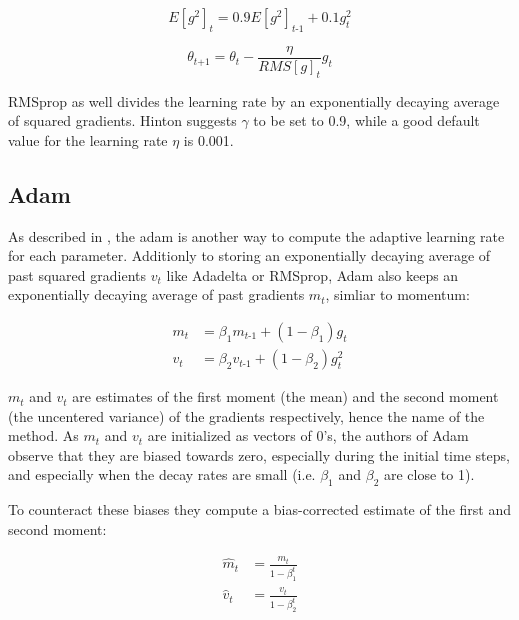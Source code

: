 \documentclass[12pt,oneside,a4paper,parskip]{scrbook}
\begin{document}
\begin{equation}
  \textit{E}[\textit{g}^2]_t = 0.9\textit{E}[\textit{g}^2]_\textit{t-1} + 0.1\textit{g}^2_t
  \label{equ:rmsprop_1}
\end{equation}

\begin{equation}
  \theta_\textit{t+1} = \theta_\textit{t}-\frac{\eta}{RMS[\textit{g}]_t} \textit{g}_\textit{t}
  \label{equ:rmsprop_2}
\end{equation}

RMSprop as well divides the learning rate by an exponentially decaying average of squared gradients.
Hinton suggests $\gamma$ to be set to 0.9, while a good default value for the learning rate $\eta$ is 0.001. \cite{overvieDiffRSLVQ}

\subsection{Adam}
As described in \cite{Kingma2014AdamAM}, the \ac{adam} is another way to compute the adaptive 
learning rate for each parameter. Additionly to storing an exponentially decaying average of past squared gradients
$\textit{v}_t$ like Adadelta or RMSprop, Adam also keeps an exponentially decaying average of past gradients $\textit{m}_t$,
simliar to momentum:

\begin{equation}
  \begin{split}
  \textit{m}_t &= \beta_1\textit{m}_\textit{t-1} + (1-\beta_1)\textit{g}_t \\
  \textit{v}_t &= \beta_2\textit{v}_\textit{t-1} + (1-\beta_2)\textit{g}^2_t
  \end{split}
  \label{equ:adam_1}
\end{equation}

$\textit{m}_t$ and $\textit{v}_t$ are estimates of the first moment (the mean) and the second moment (the uncentered variance)
of the gradients respectively, hence the name of the method. As $\textit{m}_t$ and $\textit{v}_t$ are initialized as vectors of 
0's, the authors of Adam observe that they are biased towards zero, especially during the initial time steps, and especially 
when the decay rates are small (i.e. $\beta_1$ and $\beta_2$ are close to 1).

To counteract these biases they compute a bias-corrected estimate of the first and second moment:

\begin{equation}
  \begin{split}
  \hat{m}_t &= \frac{\textit{m}_t}{1-\beta^t_1} \\
  \hat{v}_t &= \frac{\textit{v}_t}{1-\beta^t_2}
  \end{split}
  \label{equ:adam_2}
\end{equation}
\end{document}
